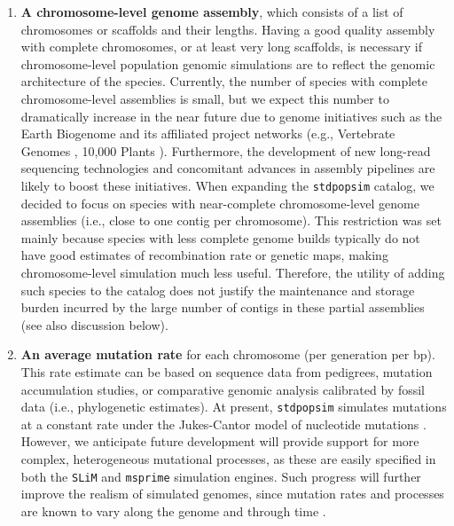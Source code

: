 \documentclass[hidelinks]{article}
\newcommand{\stdpopsim}{\texttt{stdpopsim}\xspace}
\begin{document}
\begin{enumerate}
\def\labelenumi{\arabic{enumi}.}

\item
  \textbf{A chromosome-level genome assembly}, which consists of a list of chromosomes or scaffolds and their lengths. 
  Having a good quality assembly with complete chromosomes, or at least very long scaffolds, 
  is necessary if chromosome-level population genomic simulations are to reflect the genomic architecture of the species.
  Currently, the number of species with complete chromosome-level assemblies is small,
  but we expect this number to dramatically increase in the near future due to genome initiatives 
  such as the Earth Biogenome \citep{Lewin2022} and its affiliated project networks (e.g.,
  Vertebrate Genomes \citep{Rhie2021}, 10,000 Plants \citep{Cheng2018}).
  Furthermore, the development of new long-read sequencing technologies
  \citep{Amarasinghe2020,Amarasinghe2021} and concomitant advances in assembly pipelines
  \citep{Chakraborty2016} are likely to boost these initiatives. 
  When expanding the \stdpopsim catalog, we decided to focus on species with near-complete 
  chromosome-level genome assemblies (i.e., close to one contig per chromosome).
  This restriction was set mainly because species with less complete genome builds 
  typically do not have good estimates of recombination rate or genetic maps, 
  making chromosome-level simulation much less useful. 
  Therefore, the utility of adding such species to the catalog does not justify the 
  maintenance and storage burden incurred by the large number of contigs in these partial assemblies (see also discussion below).

\item
  \textbf{An average mutation rate} for each chromosome (per generation per bp).
  This rate estimate can be based on sequence data from pedigrees, mutation accumulation studies, 
  or comparative genomic analysis calibrated by fossil data (i.e., phylogenetic estimates).
  At present, \stdpopsim simulates mutations at a constant rate under the Jukes-Cantor model of nucleotide mutations \citep{Jukes1969}.
  However, we anticipate future development will provide support for more complex, heterogeneous mutational processes,
  as these are easily specified in both the \texttt{SLiM} and \texttt{msprime} simulation engines.
  Such progress will further improve the realism of simulated genomes,
  since mutation rates and processes are known to vary along the genome and through time \citep{Benzer1961,Ellegren2003,Supek2019}.


\end{enumerate}
\end{document}
